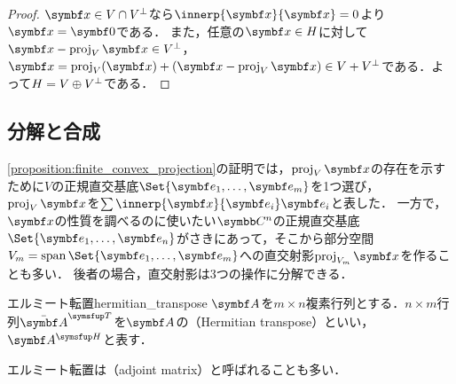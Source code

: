 \documentclass[../../main]{subfiles}
\begin{document}
\begin{proof}
  \(\vect{x}\in V\cap\pcomp{V}\)なら\(\innerp{\vect{x}}{\vect{x}}=0\)より\(\vect{x}=\zvec\)である．
  また，任意の\(\vect{x}\in H\)に対して\(\vect{x}-\proj_V\vect{x}\in\pcomp{V}\)，\(\vect{x}=\proj_V(\vect{x})+(\vect{x}-\proj_V\vect{x})\in V+\pcomp{V}\)である．よって\(H=V\oplus\pcomp{V}\)である．
\end{proof}

\subsection{分解と合成}
\label{subsection:analysis_and_synthesis}

\cref{proposition:finite_convex_projection}の証明では，\(\proj_V\vect{x}\)の存在を示すために\(V\)の正規直交基底\(\Set{\vect{e}_1,\dots,\vect{e}_m}\)を1つ選び，\(\proj_V\vect{x}\)を\(\sum\innerp{\vect{x}}{\vect{e}_i}\vect{e}_i\)と表した．
一方で，\(\vect{x}\)の性質を調べるのに使いたい\(\numset{C}^n\)の正規直交基底\(\Set{\vect{e}_1,\dots,\vect{e}_n}\)がさきにあって，そこから部分空間\(V_m=\spannedby\Set{\vect{e}_1,\dots,\vect{e}_m}\)への直交射影\(\proj_{V_m}\vect{x}\)を作ることも多い．
後者の場合，直交射影は3つの操作に分解できる．

\begin{definition}{エルミート転置}{hermitian_transpose}
  \(\mat{A}\)を\(m\times n\)複素行列とする．\(n\times m\)行列\(\trps{\conj{\mat{A}}}\)を\(\mat{A}\)の（Hermitian transpose）といい，\(\htrps{\mat{A}}\)と表す．
\end{definition}

\begin{note}
  エルミート転置は（adjoint matrix）と呼ばれることも多い．
\end{note}
\end{document}
